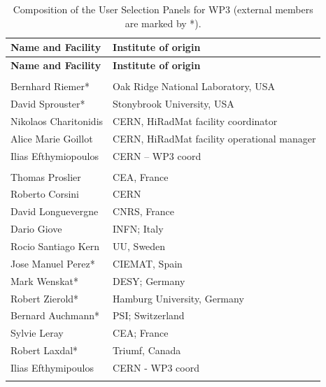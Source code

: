 
{\color{black}\begin{longtable}{|L{0.48\textwidth}|C{0.48\textwidth}|}
\caption{Composition of the User Selection Panels for WP3 (external members are marked by *).}
\label{tab:usp-wp3}
    \\ \hline
    {\bf Name and Facility} & {\bf Institute of origin} \\ \hline
    \endfirsthead
    \hline
    {\bf Name and Facility} & {\bf Institute of origin} \\ \hline
    \endhead
    \hline
    \endfoot

      \\ \hline
    Bernhard Riemer*	& Oak Ridge National Laboratory, USA  \\ \hline
     David Sprouster*	&Stonybrook University, USA  \\ \hline
    Nikolaos Charitonidis	&CERN, HiRadMat facility coordinator  \\ \hline 
    Alice Marie Goillot	& CERN, HiRadMat facility operational manager  \\ \hline
    Ilias Efthymiopoulos	& CERN – WP3 coord  \\ \hline
     \\ \hline
    Thomas Proslier	& CEA, France  \\ \hline
    Roberto Corsini	& CERN  \\ \hline
    David Longuevergne	& CNRS, France  \\ \hline
    Dario Giove	& INFN; Italy  \\ \hline
    Rocio Santiago Kern	& UU, Sweden  \\ \hline
    Jose Manuel Perez*	& CIEMAT, Spain  \\ \hline
    Mark Wenskat*	& DESY; Germany  \\ \hline
    Robert Zierold*	& Hamburg University, Germany  \\ \hline
    Bernard Auchmann*	& PSI; Switzerland  \\ \hline
    Sylvie Leray	& CEA; France  \\ \hline
    Robert Laxdal*	& Triumf, Canada  \\ \hline
    Ilias Efthymipoulos	& CERN - WP3 coord  \\ \hline
     \\ \hline

\end{longtable}}
